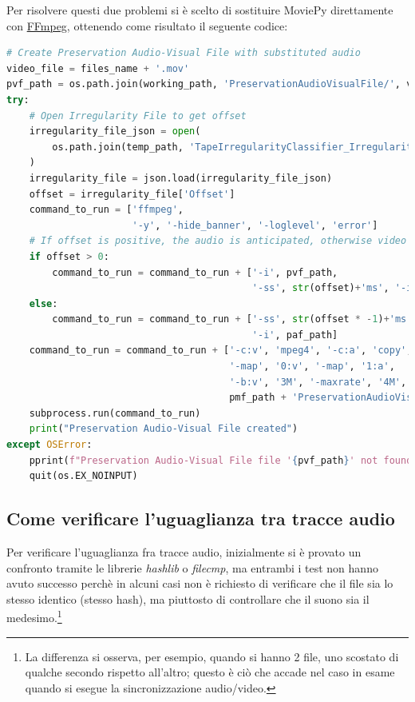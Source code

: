 Per risolvere questi due problemi si è scelto di sostituire MoviePy direttamente con \href{https://ffmpeg.org/}{FFmpeg}, ottenendo come risultato il seguente codice:
\begin{lstlisting}[language=Python, caption={Codice finale, creazione Preservation Audio-Visual File (Packager)}]
# Create Preservation Audio-Visual File with substituted audio
video_file = files_name + '.mov'
pvf_path = os.path.join(working_path, 'PreservationAudioVisualFile/', video_file)
try:
    # Open Irregularity File to get offset
    irregularity_file_json = open(
        os.path.join(temp_path, 'TapeIrregularityClassifier_IrregularityFileOutput2.json')
    )
    irregularity_file = json.load(irregularity_file_json)
    offset = irregularity_file['Offset']
    command_to_run = ['ffmpeg',
                      '-y', '-hide_banner', '-loglevel', 'error']
    # If offset is positive, the audio is anticipated, otherwise video is anticipated (through seek)
    if offset > 0:
        command_to_run = command_to_run + ['-i', pvf_path,
                                           '-ss', str(offset)+'ms', '-i', paf_path]
    else:
        command_to_run = command_to_run + ['-ss', str(offset * -1)+'ms', '-i', pvf_path,
                                           '-i', paf_path]
    command_to_run = command_to_run + ['-c:v', 'mpeg4', '-c:a', 'copy',
                                       '-map', '0:v', '-map', '1:a',
                                       '-b:v', '3M', '-maxrate', '4M', '-bufsize', '4M',
                                       pmf_path + 'PreservationAudioVisualFile.mov']
    subprocess.run(command_to_run)
    print("Preservation Audio-Visual File created")
except OSError:
    pprint(f"Preservation Audio-Visual File file '{pvf_path}' not found!", color=Color.RED)
    quit(os.EX_NOINPUT)
\end{lstlisting}


\subsection{Come verificare l'uguaglianza tra tracce audio} \label{ssec:packager-audio}    %
Per verificare l'uguaglianza fra tracce audio, inizialmente si è provato un confronto tramite le librerie \textit{hashlib} o \textit{filecmp}, ma entrambi i test non hanno avuto successo perchè in alcuni casi non è richiesto di verificare che il file sia lo stesso identico (stesso hash), ma piuttosto di controllare che il suono sia il medesimo.\footnote{La differenza si osserva, per esempio, quando si hanno 2 file, uno scostato di qualche secondo rispetto all'altro; questo è ciò che accade nel caso in esame quando si esegue la sincronizzazione audio/video.}

